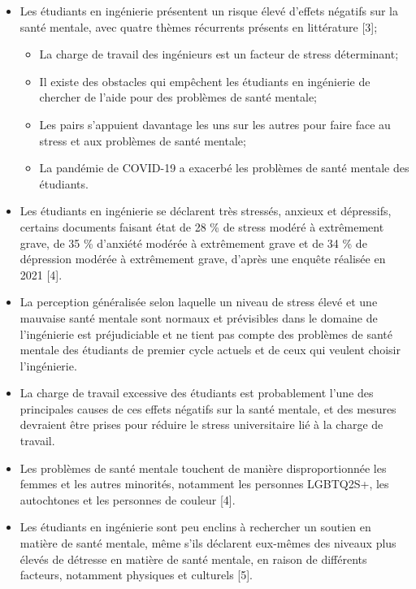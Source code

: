 \begin{itemize}
 \item Les étudiants en ingénierie présentent un risque élevé d'effets négatifs sur la santé mentale, avec quatre thèmes récurrents présents en littérature [3];
 \begin{itemize}
  \item La charge de travail des ingénieurs est un facteur de stress déterminant;
  \item Il existe des obstacles qui empêchent les étudiants en ingénierie de chercher de l'aide pour des problèmes de santé mentale;
  \item Les pairs s'appuient davantage les uns sur les autres pour faire face au stress et aux problèmes de santé mentale;
  \item La pandémie de COVID-19 a exacerbé les problèmes de santé mentale des étudiants.
 \end{itemize}
 \item Les étudiants en ingénierie se déclarent très stressés, anxieux et dépressifs, certains documents faisant état de 28 \% de stress modéré à extrêmement grave, de 35 \% d'anxiété modérée à extrêmement grave et de 34 \% de dépression modérée à extrêmement grave, d'après une enquête réalisée en 2021 [4].
 \item La perception généralisée selon laquelle un niveau de stress élevé et une mauvaise santé mentale sont normaux et prévisibles dans le domaine de l'ingénierie est préjudiciable et ne tient pas compte des problèmes de santé mentale des étudiants de premier cycle actuels et de ceux qui veulent choisir l'ingénierie.
 \item La charge de travail excessive des étudiants est probablement l'une des principales causes de ces effets négatifs sur la santé mentale, et des mesures devraient être prises pour réduire le stress universitaire lié à la charge de travail.
 \item Les problèmes de santé mentale touchent de manière disproportionnée les femmes et les autres minorités, notamment les personnes LGBTQ2S+, les autochtones et les personnes de couleur [4].
 \item Les étudiants en ingénierie sont peu enclins à rechercher un soutien en matière de santé mentale, même s'ils déclarent eux-mêmes des niveaux plus élevés de détresse en matière de santé mentale, en raison de différents facteurs, notamment physiques et culturels [5].
\end{itemize}


